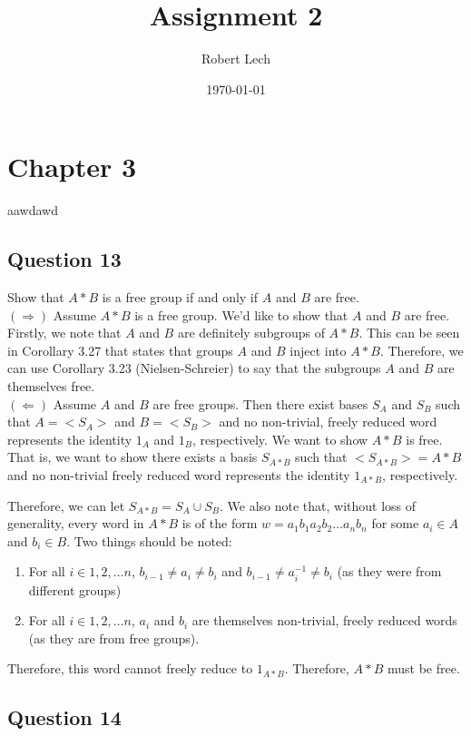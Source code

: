 \documentclass[12pt]{article}%
\begin{document}
\title{Assignment 2}
\author{Robert Lech}
\date{\today}
\maketitleawdaw
\section*{Chapter 3}aawdawd

\subsection*{Question 13}

Show that $A*B$ is a free group if and only if $A$ and $B$ are free.\\

$(\Rightarrow)$ Assume $A*B$ is a free group. We'd like to show that $A$ and $B$ are free. Firstly, we note that $A$ and $B$ are definitely subgroups of $A*B$. This can be seen in Corollary 3.27 that states that groups $A$ and $B$ inject into $A*B$. Therefore, we can use Corollary 3.23 (Nielsen-Schreier) to say that the subgroups $A$ and $B$ are themselves free.\\

$(\Leftarrow)$ Assume $A$ and $B$ are free groups. Then there exist bases $S_A$ and $S_B$ such that $A=<S_A>$ and $B=<S_B>$ and no non-trivial, freely reduced word represents the identity $1_A$ and $1_B$, respectively. We want to show $A*B$ is free. That is, we want to show there exists a basis $S_{A*B}$ such that $<S_{A*B}>=A*B$ and no non-trivial freely reduced word represents the identity $1_{A*B}$, respectively.

Therefore, we can let $S_{A*B}=S_A \cup S_B$. We also note that, without loss of generality, every word in $A*B$ is of the form $w=a_{1}b_{1}a_{2}b_{2}\ldots a_{n}b_{n}$ for some $a_i\in A$ and $b_i\in B$. Two things should be noted: 

\begin{enumerate}
\item For all $i\in {1, 2, \ldots n}$, $b_{i-1} \neq a_i \neq b_i$ and $b_{i-1} \neq a_i^{-1} \neq b_i$ (as they were from different groups)
\item For all $i\in {1, 2, \ldots n}$, $a_i$ and $b_i$ are themselves non-trivial, freely reduced words (as they are from free groups).
\end{enumerate}

Therefore, this word cannot freely reduce to $1_{A*B}$. Therefore, $A*B$ must be free.
\subsection*{Question 14}
\end{document}
